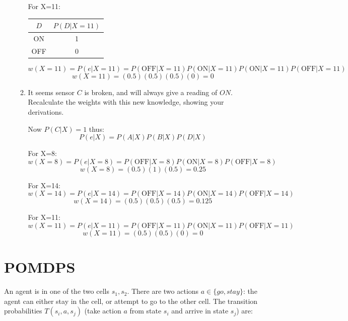 \documentclass[12pt]{article}
\begin{document}
\begin{enumerate}
\begin{enumerate}
  For X=11:
  \begin{center}
    \begin{tabular}{|c|c|}
      \hline
      $D$ & $P(D|X=11)$ \\
      \hline
      ON & 1 \\
      \hline
      OFF & 0 \\
      \hline
    \end{tabular}
  \end{center}
  \[
    w(X=11) = P(e|X=11) = P(\text{OFF}|X=11) P(\text{ON}|X=11) P(\text{ON}|X=11) P(\text{OFF}|X=11)
  \]
  \[
    w(X=11) = (0.5)(0.5)(0.5)(0) = 0
  \]

  \item It seems sensor $C$ is broken, and will always give a reading
    of $ON$. Recalculate the weights with this new knowledge, showing
    your derivations.

    Now $P(C|X) = 1$ thus:
    \[
      P(e|X) = P(A|X)P(B|X)P(D|X)
    \]

    For X=8:
    \[
      w(X=8) = P(e|X=8) = P(\text{OFF}|X=8) P(\text{ON}|X=8) P(\text{OFF}|X=8)
    \]
    \[
      w(X=8) = (0.5)(1)(0.5) = 0.25
    \]

    For X=14:
    \[
      w(X=14) = P(e|X=14) = P(\text{OFF}|X=14) P(\text{ON}|X=14) P(\text{OFF}|X=14)
    \]
    \[
      w(X=14) = (0.5)(0.5)(0.5) = 0.125
    \]

    For X=11:
    \[
      w(X=11) = P(e|X=11) = P(\text{OFF}|X=11) P(\text{ON}|X=11) P(\text{OFF}|X=11)
    \]
    \[
      w(X=11) = (0.5)(0.5)(0) = 0
    \]

  \end{enumerate}

\end{enumerate}

\clearpage

\section{POMDPS}

An agent is in one of the two cells $s_1,s_2$.  There are two actions
$a \in \{ go, stay\}$: the agent can either stay in the cell, or
attempt to go to the other cell.  The transition probabilities
$T(s_i,a,s_j)$ (take action $a$ from state $s_i$ and arrive in state
$s_j$) are:
\end{document}

